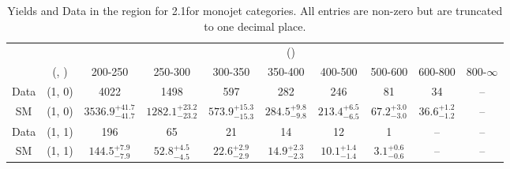 \begin{table}[h!]
\tiny
\centering
\caption{Yields and Data in the \mj region for 2.1\ifb for monojet categories. All entries are non-zero but are truncated to one decimal place.\label{tab:yieldsall_mu_comb_mono}}
\begin{tabular}
{cccccccccc}
	\hline\hline
	&	& \multicolumn{8}{c}{\scalht (\gev)}\\ 
	&	 (\njet, \nb) & 200-250 & 250-300 & 300-350 & 350-400 & 400-500 & 500-600 & 600-800 & 800-$\infty$ \\ [0.8ex] 
\hline
	Data & (1, 0) & 4022 & 1498 & 597 & 282 & 246 & 81 & 34 & -- \\[0.5ex] 
	SM & (1, 0) & $3536.9^{+ 41.7 }_{- 41.7 }$ & $1282.1^{+ 23.2 }_{- 23.2 }$ & $573.9^{+ 15.3 }_{- 15.3 }$ & $284.5^{+ 9.8 }_{- 9.8 }$ & $213.4^{+ 6.5 }_{- 6.5 }$ & $67.2^{+ 3.0 }_{- 3.0 }$ & $36.6^{+ 1.2 }_{- 1.2 }$ & -- \\[0.5ex] 
	Data & (1, 1) & 196 & 65 & 21 & 14 & 12 & 1 & -- & -- \\[0.5ex] 
	SM & (1, 1) & $144.5^{+ 7.9 }_{- 7.9 }$ & $52.8^{+ 4.5 }_{- 4.5 }$ & $22.6^{+ 2.9 }_{- 2.9 }$ & $14.9^{+ 2.3 }_{- 2.3 }$ & $10.1^{+ 1.4 }_{- 1.4 }$ & $3.1^{+ 0.6 }_{- 0.6 }$ & -- & -- \\[0.5ex] 
	\hline
	\hline
\end{tabular}
\end{table}
